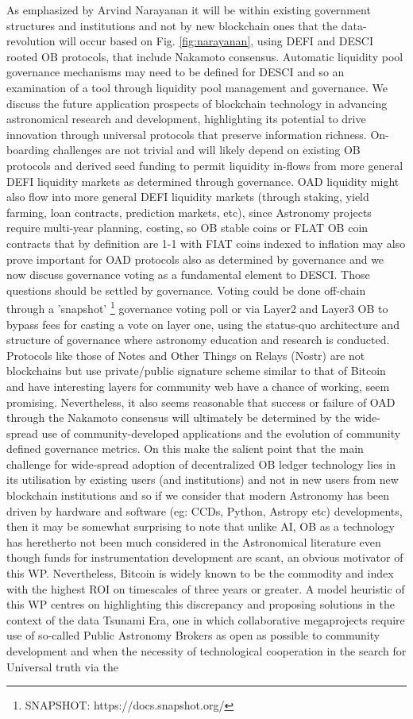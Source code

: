 \documentclass[final,5p,times,twocolumn,authoryear]{elsarticle}
\begin{document}
As emphasized by Arvind Narayanan it will be within existing government structures and institutions and not by new blockchain ones that the data-revolution will occur based on Fig. \ref{fig:narayanan}, using DEFI and DESCI rooted OB protocols, that include Nakamoto consensus. Automatic liquidity pool governance mechanisms may need to be defined for DESCI and so an examination of a tool through liquidity pool management and governance. We discuss the future application prospects of blockchain technology in advancing astronomical research and development, highlighting its potential to drive innovation through universal protocols that preserve information richness. On-boarding challenges are not trivial and will likely depend on existing OB protocols and derived seed funding to permit liquidity in-flows from more general DEFI liquidity markets as determined through governance. OAD liquidity might also flow into more general DEFI liquidity markets (through staking, yield farming, loan contracts, prediction markets, etc), since Astronomy projects require multi-year planning, costing, so OB stable coins or FLAT OB coin contracts that by definition are 1-1 with FIAT coins indexed to inflation may also prove important for OAD protocols also as determined by governance and we now discuss governance voting as a fundamental element to DESCI. Those questions should be settled by governance. Voting could be done off-chain through a 'snapshot' \footnote{SNAPSHOT: https://docs.snapshot.org/} governance voting poll or via Layer2 and Layer3 OB to bypass fees for casting a vote on layer one, using the status-quo architecture and structure of governance where astronomy education and research is conducted. Protocols like those of Notes and Other Things on Relays (Nostr) are not blockchains but use private/public signature scheme similar to that of Bitcoin and have interesting layers for community web have a chance of working, seem promising. Nevertheless, it also seems reasonable that success or failure of OAD through the Nakamoto consensus will ultimately be determined by the wide-spread use of community-developed applications and the evolution of community defined governance metrics. On this \cite{arvindandclark2017} make the salient point that the main challenge for wide-spread adoption of decentralized OB ledger technology lies in its utilisation by existing users (and institutions) and not in new users from new blockchain institutions and so if we consider that modern Astronomy has been driven by hardware and software (eg: CCDs, Python, Astropy etc) developments, then it may be somewhat surprising to note that unlike AI, OB as a technology has heretherto not been much considered in the Astronomical literature even though funds for instrumentation development are scant, an obvious motivator of this WP. Nevertheless, Bitcoin is widely known to be the commodity and index with the highest ROI on timescales of three years or greater. A model heuristic of this WP centres on highlighting this discrepancy and proposing solutions in the context of the data Tsunami Era, one in which collaborative megaprojects require use of so-called Public Astronomy Brokers as open as possible to community development and when the necessity of technological cooperation in the search for Universal truth via the 
\end{document}
